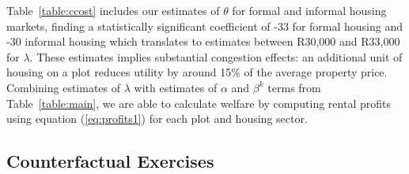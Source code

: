 \documentclass[12pt]{article}
\begin{document}
Table~\ref{table:ccost} includes our estimates of $\theta$ for formal and informal housing markets, finding a statistically significant coefficient of -33 for formal housing and -30 informal housing which translates to estimates between R30,000 and R33,000 for $\lambda$.  These estimates implies substantial congestion effects: an additional unit of housing on a plot reduces utility by around 15\% of the average property price.  Combining estimates of $\lambda$ with estimates of $\alpha$ and $\beta^{k}$ terms from Table~\ref{table:main}, we are able to calculate welfare by computing rental profits using equation (\ref{eq:profits1}) for each plot and housing sector.


\subsection{Counterfactual Exercises}
\end{document}
